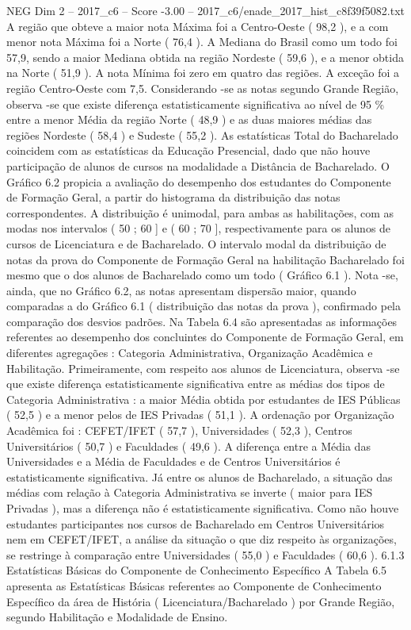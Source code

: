 \begin{textsample}{NEG Dim 2 – 2017\_c6 – Score -3.00 – 2017\_c6/enade\_2017\_hist\_c8f39f5082.txt}
A região que obteve a maior nota Máxima foi a Centro-Oeste ( 98,2 ), e a com menor nota Máxima foi a Norte ( 76,4 ).
A Mediana do Brasil como um todo foi 57,9, sendo a maior Mediana obtida na região Nordeste ( 59,6 ), e a menor obtida na Norte ( 51,9 ).
A nota Mínima foi zero em quatro das regiões.
A exceção foi a região Centro-Oeste com 7,5.
Considerando -se as notas segundo Grande Região, observa -se que existe diferença estatisticamente significativa ao nível de 95 \% entre a menor Média da região Norte ( 48,9 ) e as duas maiores médias das regiões Nordeste ( 58,4 ) e Sudeste ( 55,2 ).
As estatísticas Total do Bacharelado coincidem com as estatísticas da Educação Presencial, dado que não houve participação de alunos de cursos na modalidade a Distância de Bacharelado.
O Gráfico 6.2 propicia a avaliação do desempenho dos estudantes do Componente de Formação Geral, a partir do histograma da distribuição das notas correspondentes.
A distribuição é unimodal, para ambas as habilitações, com as modas nos intervalos ( 50 ; 60 ] e ( 60 ; 70 ], respectivamente para os alunos de cursos de Licenciatura e de Bacharelado.
O intervalo modal da distribuição de notas da prova do Componente de Formação Geral na habilitação Bacharelado foi mesmo que o dos alunos de Bacharelado como um todo ( Gráfico 6.1 ).
Nota -se, ainda, que no Gráfico 6.2, as notas apresentam dispersão maior, quando comparadas a do Gráfico 6.1 ( distribuição das notas da prova ), confirmado pela comparação dos desvios padrões.
Na Tabela 6.4 são apresentadas as informações referentes ao desempenho dos concluintes do Componente de Formação Geral, em diferentes agregações : Categoria Administrativa, Organização Acadêmica e Habilitação.
Primeiramente, com respeito aos alunos de Licenciatura, observa -se que existe diferença estatisticamente significativa entre as médias dos tipos de Categoria Administrativa : a maior Média obtida por estudantes de IES Públicas ( 52,5 ) e a menor pelos de IES Privadas ( 51,1 ).
A ordenação por Organização Acadêmica foi : CEFET/IFET ( 57,7 ), Universidades ( 52,3 ), Centros Universitários ( 50,7 ) e Faculdades ( 49,6 ).
A diferença entre a Média das Universidades e a Média de Faculdades e de Centros Universitários é estatisticamente significativa.
Já entre os alunos de Bacharelado, a situação das médias com relação à Categoria Administrativa se inverte ( maior para IES Privadas ), mas a diferença não é estatisticamente significativa.
Como não houve estudantes participantes nos cursos de Bacharelado em Centros Universitários nem em CEFET/IFET, a análise da situação o que diz respeito às organizações, se restringe à comparação entre Universidades ( 55,0 ) e Faculdades ( 60,6 ). 6.1.3 Estatísticas Básicas do Componente de Conhecimento Específico A Tabela 6.5 apresenta as Estatísticas Básicas referentes ao Componente de Conhecimento Específico da área de História ( Licenciatura/Bacharelado ) por Grande Região, segundo Habilitação e Modalidade de Ensino.

\end{textsample}
